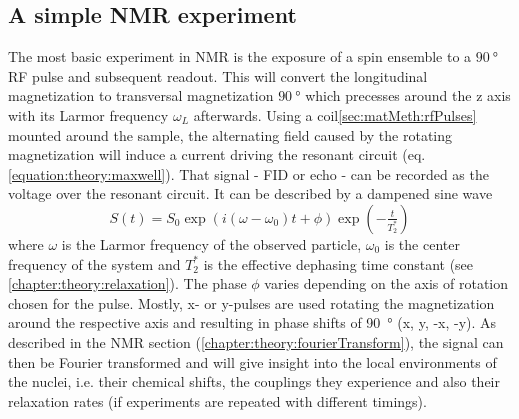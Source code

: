         \subsection{A simple NMR experiment}
        The most basic experiment in NMR is the exposure of a spin ensemble to a $\SI{90}{\degree}$ RF pulse and subsequent readout. This will convert the longitudinal magnetization to transversal magnetization $\SI{90}{\degree}$ which precesses around the z axis with its Larmor frequency $\omega_L$ afterwards. Using a coil\ref{sec:matMeth:rfPulses} mounted around the sample, the alternating field caused by the rotating magnetization will induce a current driving the resonant circuit (eq. \ref{equation:theory:maxwell}). That signal - FID or echo - can be recorded as the voltage over the resonant circuit. It can be described by a dampened sine wave
            \begin{equation}
                S(t) = S_0 \exp(i(\omega - \omega_0)  t + \phi) \exp(-\tfrac{t}{T_2^*})
            \end{equation}
            where $\omega$ is the Larmor frequency of the observed particle, $\omega_0$ is the center frequency of the system and $T_2^*$ is the effective dephasing time constant (see \ref{chapter:theory:relaxation}). The phase $\phi$ varies depending on the axis of rotation chosen for the pulse. Mostly, x- or y-pulses are used rotating the magnetization around the respective axis and resulting in phase shifts of \SI{90}{\degree} (x, y, -x, -y). As described in the NMR section (\ref{chapter:theory:fourierTransform}), the signal can then be Fourier transformed and will give insight into the local environments of the nuclei, i.e. their chemical shifts, the couplings they experience and also their relaxation rates (if experiments are repeated with different timings). 
